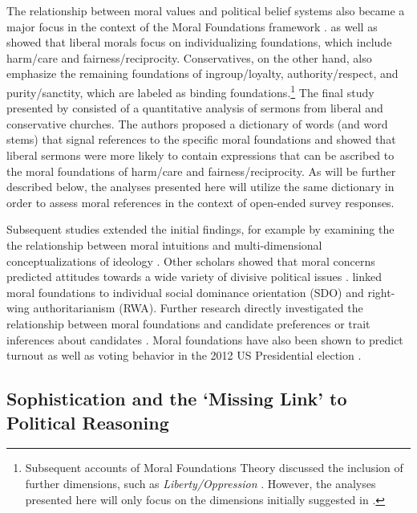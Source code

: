 \documentclass[12pt]{article}
\begin{document}
The relationship between moral values and political belief systems also became a major focus in the context of the Moral Foundations framework \citep[c.f.][]{haidt2012righteous}. \citet{haidt2007morality} as well as \citet{graham2009liberals} showed that liberal morals focus on individualizing foundations, which include harm/care and fairness/reciprocity. Conservatives, on the other hand, also emphasize the remaining foundations of ingroup/loyalty, authority/respect, and purity/sanctity, which are labeled as binding foundations.\footnote{Subsequent accounts of Moral Foundations Theory discussed the inclusion of further dimensions, such as \textit{Liberty/Oppression} \citep[c.f.][]{graham2013moral,haidt2012righteous}. However, the analyses presented here will only focus on the dimensions initially suggested in \citet{haidt2008moral}.} The final study presented by \citet{graham2009liberals} consisted of a quantitative analysis of sermons from liberal and conservative churches. The authors proposed a dictionary of words (and word stems) that signal references to the specific moral foundations and showed that liberal sermons were more likely to contain expressions that can be ascribed to the moral foundations of harm/care and fairness/reciprocity. As will be further described below, the analyses presented here will utilize the same dictionary in order to assess moral references in the context of open-ended survey responses.

Subsequent studies extended the initial findings, for example by examining the the relationship between moral intuitions and multi-dimensional conceptualizations of ideology \citep[c.f.][]{haidt2009above}.  Other scholars showed that moral concerns predicted attitudes towards a wide variety of divisive political issues \citep[e.g.][]{koleva2012tracing,low2015moral}. \citet{federico2013mapping} linked moral foundations to individual social dominance orientation (SDO) and right-wing authoritarianism (RWA). Further research directly investigated the relationship between moral foundations and candidate preferences \citep{iyer2010beyond} or trait inferences about candidates \citep{clifford2014linking}. Moral foundations have also been shown to predict turnout \citep{johnson2014ideology} as well as voting behavior in the 2012 US Presidential election \citep{franks2015using}.


\subsection{Sophistication and the `Missing Link' to Political Reasoning}
\end{document}
